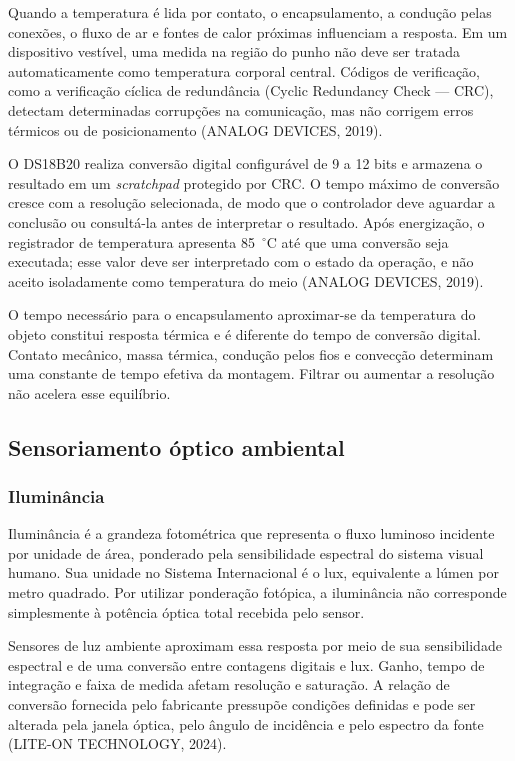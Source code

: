 \documentclass[a4paper,12pt]{article}
\begin{document}
Quando a temperatura \'e lida por contato, o encapsulamento, a condu\c{c}\~ao pelas conex\~oes, o fluxo de ar e fontes de calor pr\'oximas influenciam a resposta. Em um dispositivo vest\'ivel, uma medida na regi\~ao do punho n\~ao deve ser tratada automaticamente como temperatura corporal central. C\'odigos de verifica\c{c}\~ao, como a verifica\c{c}\~ao c\'iclica de redund\^ancia (Cyclic Redundancy Check --- CRC), detectam determinadas corrup\c{c}\~oes na comunica\c{c}\~ao, mas n\~ao corrigem erros t\'ermicos ou de posicionamento (ANALOG DEVICES, 2019).


O DS18B20 realiza convers\~ao digital configur\'avel de 9 a 12 bits e armazena o resultado em um \emph{scratchpad} protegido por CRC. O tempo m\'aximo de convers\~ao cresce com a resolu\c{c}\~ao selecionada, de modo que o controlador deve aguardar a conclus\~ao ou consult\'a-la antes de interpretar o resultado. Ap\'os energiza\c{c}\~ao, o registrador de temperatura apresenta 85~$^\circ$C at\'e que uma convers\~ao seja executada; esse valor deve ser interpretado com o estado da opera\c{c}\~ao, e n\~ao aceito isoladamente como temperatura do meio (ANALOG DEVICES, 2019).


O tempo necess\'ario para o encapsulamento aproximar-se da temperatura do objeto constitui resposta t\'ermica e \'e diferente do tempo de convers\~ao digital. Contato mec\^anico, massa t\'ermica, condu\c{c}\~ao pelos fios e convec\c{c}\~ao determinam uma constante de tempo efetiva da montagem. Filtrar ou aumentar a resolu\c{c}\~ao n\~ao acelera esse equil\'ibrio.


\subsection{Sensoriamento \'optico ambiental}


\subsubsection{Ilumin\^ancia}


Ilumin\^ancia \'e a grandeza fotom\'etrica que representa o fluxo luminoso incidente por unidade de \'area, ponderado pela sensibilidade espectral do sistema visual humano. Sua unidade no Sistema Internacional \'e o lux, equivalente a l\'umen por metro quadrado. Por utilizar pondera\c{c}\~ao fot\'opica, a ilumin\^ancia n\~ao corresponde simplesmente \`a pot\^encia \'optica total recebida pelo sensor.


Sensores de luz ambiente aproximam essa resposta por meio de sua sensibilidade espectral e de uma convers\~ao entre contagens digitais e lux. Ganho, tempo de integra\c{c}\~ao e faixa de medida afetam resolu\c{c}\~ao e satura\c{c}\~ao. A rela\c{c}\~ao de convers\~ao fornecida pelo fabricante pressup\~oe condi\c{c}\~oes definidas e pode ser alterada pela janela \'optica, pelo \^angulo de incid\^encia e pelo espectro da fonte (LITE-ON TECHNOLOGY, 2024).
\end{document}
